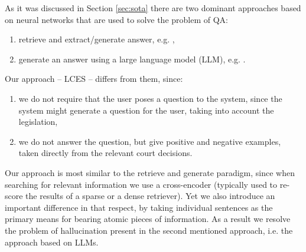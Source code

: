 As it was discussed in Section \ref{sec:sota} there are two dominant approaches 
based on neural networks that are used to solve the problem of QA:
\begin{enumerate}
  \item retrieve and extract/generate answer, e.g. \cite{lewis2020retrieval}, %
  \item generate an answer using a large language model (LLM), e.g. \cite{brown2020language}. %
\end{enumerate}
Our approach -- LCES -- differs from them, since:
\begin{enumerate}
  \item we do not require that the user poses a question to the system, since the system might generate a question for the user,
    taking into account the legislation,
  \item we do not answer the question, but give positive and negative examples, taken directly from the relevant court decisions.
\end{enumerate}
Our approach is most similar to the retrieve and generate paradigm, since when searching for relevant information we use
a cross-encoder (typically used to re-score the results of a sparse or a dense retriever). Yet we also introduce an important
difference in that respect, by taking individual sentences as the primary means for bearing atomic pieces of information.  
As a result we resolve the problem of hallucination present in the second mentioned approach, i.e. the approach based on LLMs.

